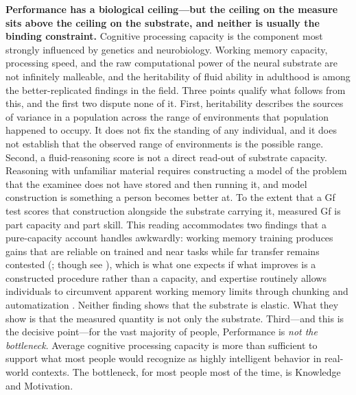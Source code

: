 \documentclass[12pt,a4paper]{article}
\begin{document}
\textbf{Performance has a biological ceiling---\hspace{0pt}but the ceiling on the measure sits above the ceiling on the substrate, and neither is usually the binding constraint.} Cognitive processing capacity is the component most strongly influenced by genetics and neurobiology. Working memory capacity, processing speed, and the raw computational power of the neural substrate are not infinitely malleable, and the heritability of fluid ability in adulthood is among the better-replicated findings in the field. Three points qualify what follows from this, and the first two dispute none of it. First, heritability describes the sources of variance in a population across the range of environments that population happened to occupy. It does not fix the standing of any individual, and it does not establish that the observed range of environments is the possible range. Second, a fluid-reasoning score is not a direct read-out of substrate capacity. Reasoning with unfamiliar material requires constructing a model of the problem that the examinee does not have stored and then running it, and model construction is something a person becomes better at. To the extent that a Gf test scores that construction alongside the substrate carrying it, measured Gf is part capacity and part skill. This reading accommodates two findings that a pure-capacity account handles awkwardly: working memory training produces gains that are reliable on trained and near tasks while far transfer remains contested (\citealp{Jaeggi2008}; though see \citealp[][for debate about transfer]{MelbyLervag2013}), which is what one expects if what improves is a constructed procedure rather than a capacity, and expertise routinely allows individuals to circumvent apparent working memory limits through chunking and automatization \citep{ChaseSimon1973}. Neither finding shows that the substrate is elastic. What they show is that the measured quantity is not only the substrate. Third---\hspace{0pt}and this is the decisive point---\hspace{0pt}for the vast majority of people, Performance is \emph{not the bottleneck}. Average cognitive processing capacity is more than sufficient to support what most people would recognize as highly intelligent behavior in real-world contexts. The bottleneck, for most people most of the time, is Knowledge and Motivation.
\end{document}
